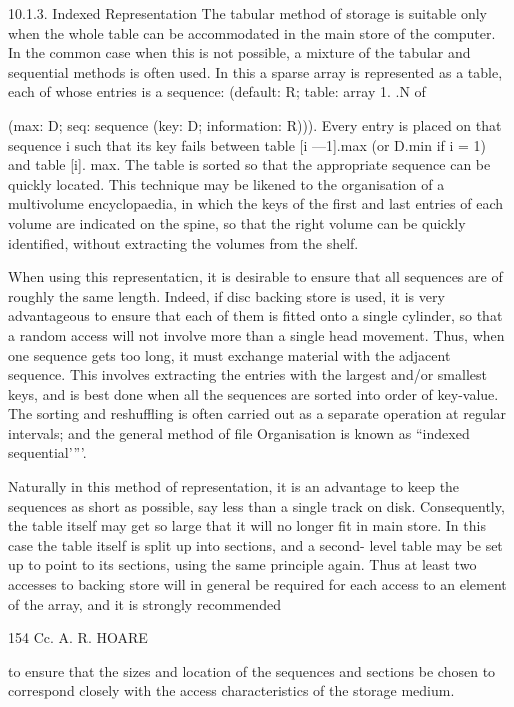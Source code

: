 {{		10.1.3. Indexed Representation The tabular method of storage is suitable only when the whole table can be accommodated in the main store of the computer. In the common case when this is not possible, a mixture of the tabular and sequential methods is often used. In this a sparse array is represented as a table, each of whose entries is a sequence: (default: R; table: array 1. .N of
		
		(max: D; seq: sequence (key: D; information: R))). Every entry is placed on that sequence i such that its key fails between table [i —1].max (or D.min if i = 1) and table [i]. max. The table is sorted so that the appropriate sequence can be quickly located. This technique may be likened to the organisation of a multivolume encyclopaedia, in which the keys of the first and last entries of each volume are indicated on the spine, so that the right volume can be quickly identified, without extracting the volumes from the shelf.
		
		When using this representaticn, it is desirable to ensure that all sequences are of roughly the same length. Indeed, if disc backing store is used, it is very advantageous to ensure that each of them is fitted onto a single cylinder, so that a random access will not involve more than a single head movement. Thus, when one sequence gets too long, it must exchange material with the adjacent sequence. This involves extracting the entries with the largest and/or smallest keys, and is best done when all the sequences are sorted into order of key-value. The sorting and reshuffling is often carried out as a separate operation at regular intervals; and the general method of file Organisation is known as “indexed sequential’”’.
		
		Naturally in this method of representation, it is an advantage to keep the sequences as short as possible, say less than a single track on disk. Consequently, the table itself may get so large that it will no longer fit in main store. In this case the table itself is split up into sections, and a second- level table may be set up to point to its sections, using the same principle again. Thus at least two accesses to backing store will in general be required for each access to an element of the array, and it is strongly recommended
		
		154 Cc. A. R. HOARE
		
		to ensure that the sizes and location of the sequences and sections be chosen to correspond closely with the access characteristics of the storage medium.
		
}}
